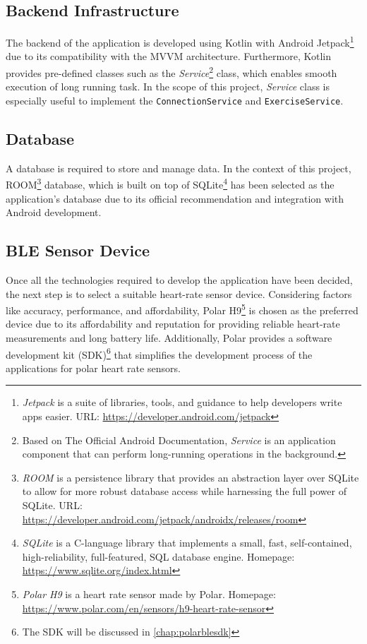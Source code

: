 \subsection{Backend Infrastructure}
The backend of the application is developed using Kotlin with Android Jetpack\footnote{\emph{Jetpack} is a suite of libraries, tools, and guidance to help developers write apps easier. URL: \url{https://developer.android.com/jetpack}} due to its compatibility with the MVVM architecture. 
Furthermore, Kotlin provides pre-defined classes such as the \emph{Service}\footnote{Based on The Official Android Documentation, \emph{Service} is an application component that can perform long-running operations in the background.\autocite{android-services}} class, which enables smooth execution of long running task. In the scope of this project, \emph{Service} class is especially useful to implement the \texttt{ConnectionService} and \texttt{ExerciseService}.

\subsection{Database}
A database is required to store and manage data. In the context of this project, ROOM\footnote{\emph{ROOM} is a persistence library that provides an abstraction layer over SQLite to allow for more robust database access while harnessing the full power of SQLite. URL: \url{https://developer.android.com/jetpack/androidx/releases/room}} database, which is built on top of SQLite\footnote{\emph{SQLite} is a C-language library that implements a small, fast, self-contained, high-reliability, full-featured, SQL database engine. Homepage: \url{https://www.sqlite.org/index.html}} has been selected as the application's database due to its official recommendation and integration with Android development.

\subsection{BLE Sensor Device}
Once all the technologies required to develop the application have been decided, the next step is to select a suitable heart-rate sensor device. Considering factors like accuracy, performance, and affordability, Polar H9\footnote{\emph{Polar H9} is a heart rate sensor made by Polar. Homepage: \url{https://www.polar.com/en/sensors/h9-heart-rate-sensor}} is chosen as the preferred device due to its affordability and reputation for providing reliable heart-rate measurements and long battery life. Additionally, Polar provides a software development kit (SDK)\footnote{The SDK will be discussed in \autoref{chap:polarblesdk}} that simplifies the development process of the applications for polar heart rate sensors.